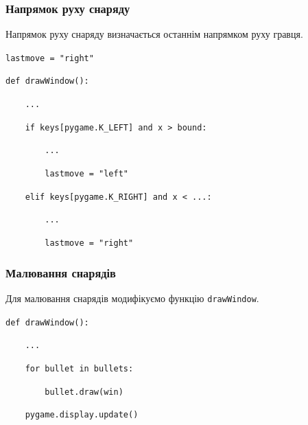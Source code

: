 \begin{frame}
\frametitle{Напрямок руху снаряду}
Напрямок руху снаряду визначається останнім напрямком руху гравця.

\texttt{lastmove = "right"}

\texttt{def drawWindow():}

\texttt{~~~~...}

\texttt{~~~~if keys[pygame.K\_LEFT] and x > bound:}

\texttt{~~~~~~~~...}

\texttt{~~~~~~~~lastmove = "left"}

\texttt{~~~~elif keys[pygame.K\_RIGHT] and x < ...:}

\texttt{~~~~~~~~...}

\texttt{~~~~~~~~lastmove = "right"}
\end{frame}

\begin{frame}
\frametitle{Малювання снарядів}
Для малювання снарядів модифікуємо функцію \texttt{drawWindow}.

\texttt{def drawWindow():}

\texttt{~~~~...}

\texttt{~~~~for bullet in bullets:}

\texttt{~~~~~~~~bullet.draw(win)}

\texttt{~~~~pygame.display.update()}
\end{frame}
